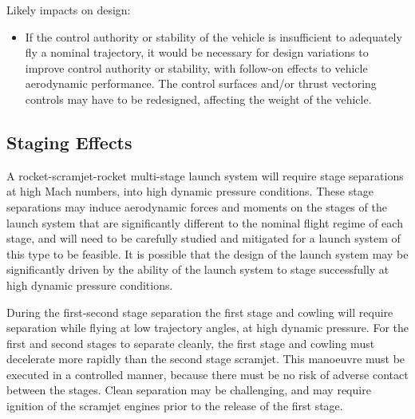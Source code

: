 Likely impacts on design:
\begin{itemize}[noitemsep,topsep=0pt]
	\item If the control authority or stability of the vehicle is insufficient to adequately fly a nominal trajectory, it would be necessary for design variations to improve control authority or stability, with follow-on effects to vehicle aerodynamic performance. The control surfaces and/or thrust vectoring controls may have to be redesigned, affecting the weight of the vehicle. 
\end{itemize}
	

	


\subsection{Staging Effects}\label{sec:stagingSimp}

A rocket-scramjet-rocket multi-stage launch system will require stage separations at high Mach numbers, into high dynamic pressure conditions. These stage separations may induce aerodynamic forces and moments on the stages of the launch system that are significantly different to the nominal flight regime of each stage, and will need to be carefully studied and mitigated for a launch system of this type to be feasible. It is possible that the design of the launch system may be significantly driven by the ability of the launch system to stage successfully at high dynamic pressure conditions. 

During the first-second stage separation the first stage and cowling will require separation while flying at low trajectory angles, at high dynamic pressure. For the first and second stages to separate cleanly, the first stage and cowling must decelerate more rapidly than the second stage scramjet. This manoeuvre must be executed in a controlled manner, because there must be no risk of adverse contact between the stages. Clean separation may be challenging, and may require ignition of the scramjet engines prior to the release of the first stage. 

